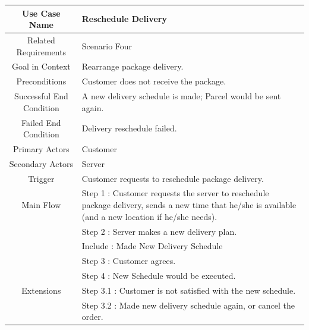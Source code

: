 \documentclass[12pt]{scrreprt}
\begin{document}
\begin{table}
  \centering
  \begin{tabular}{| c | p{11cm} |}
    \hline
    Use Case Name & Reschedule Delivery\\
    \hline
    Related Requirements & Scenario Four\\
    \hline
    Goal in Context & Rearrange package delivery.\\
    \hline
    Preconditions & Customer does not receive the package.\\
    \hline
    Successful End Condition & A new delivery schedule is made; Parcel would
    be sent again.\\
    \hline
    Failed End Condition & Delivery reschedule failed.\\
    \hline
    Primary Actors & Customer\\
    \hline
    Secondary Actors & Server\\
    \hline
    Trigger & Customer requests to reschedule package delivery.\\
    \hline
    Main Flow & Step 1 : Customer requests the server to reschedule package
    delivery, sends a new time that he/she is available (and a new location if
    he/she needs).\\
    & Step 2 : Server makes a new delivery plan.\\
    & Include : Made New Delivery Schedule\\
    & Step 3 : Customer agrees.\\
    & Step 4 : New Schedule would be executed.\\
    \hline
    Extensions & Step 3.1 : Customer is not satisfied with the new schedule.\\
    & Step 3.2 : Made new delivery schedule again, or cancel the order.\\
    \hline
  \end{tabular}
\end{table}
\end{document}
